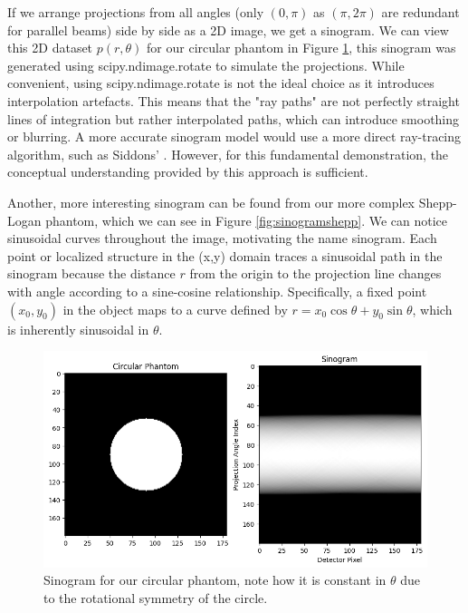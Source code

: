 \documentclass{article}
\theoremstyle{definition}
\begin{document}
If we arrange projections from all angles (only $(0,\pi)$ as $(\pi, 2\pi)$ are redundant for parallel beams) side by side as a 2D image, we get a sinogram. We can view this 2D dataset $p(r, \theta)$ for our circular phantom in Figure \ref{fig:sinogramcircle}, this sinogram was generated using scipy.ndimage.rotate to simulate the projections. While convenient, using scipy.ndimage.rotate is not the ideal choice as it introduces interpolation artefacts. This means that the "ray paths" are not perfectly straight lines of integration but rather interpolated paths, which can introduce smoothing or blurring. A more accurate sinogram model would use a more direct ray-tracing algorithm, such as Siddons' \cite{Siddon1985}. However, for this fundamental demonstration, the conceptual understanding provided by this approach is sufficient.

Another, more interesting sinogram can be found from our more complex Shepp-Logan phantom, which we can see in Figure \ref{fig:sinogramshepp}. We can notice sinusoidal curves throughout the image, motivating the name sinogram. Each point or localized structure in the (x,y) domain traces a sinusoidal path in the sinogram because the distance $r$ from the origin to the projection line changes with angle according to a sine-cosine relationship. Specifically, a fixed point $(x_0, y_0)$ in the object maps to a curve defined by $r = x_0 \cos \theta + y_0 \sin \theta$, which is inherently sinusoidal in $\theta$.

\begin{figure}[H]
	\includegraphics[scale=0.5]{sinogramcircle.png}
	\caption{Sinogram for our circular phantom, note how it is constant in $\theta$ due to the rotational symmetry of the circle.}
	\label{fig:sinogramcircle}
\end{figure}
\end{document}

